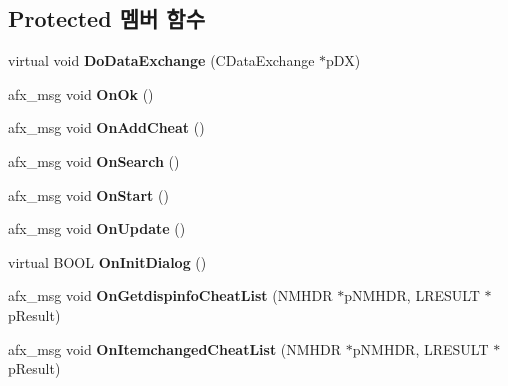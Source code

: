 \subsection*{Protected 멤버 함수}
\begin{DoxyCompactItemize}
\item 
\mbox{\label{class_g_b_cheat_search_ab867411287037dfaee49451bb149d5ad}} 
virtual void {\bfseries Do\+Data\+Exchange} (C\+Data\+Exchange $\ast$p\+DX)
\item 
\mbox{\label{class_g_b_cheat_search_a8a4503d0b05a2061a281f01b6e23f586}} 
afx\+\_\+msg void {\bfseries On\+Ok} ()
\item 
\mbox{\label{class_g_b_cheat_search_acd735709495f4e21e284a4442886152a}} 
afx\+\_\+msg void {\bfseries On\+Add\+Cheat} ()
\item 
\mbox{\label{class_g_b_cheat_search_acdfee4ab94748a31036cd473c60a4573}} 
afx\+\_\+msg void {\bfseries On\+Search} ()
\item 
\mbox{\label{class_g_b_cheat_search_add94032f04d4e03bee943d9a7051df20}} 
afx\+\_\+msg void {\bfseries On\+Start} ()
\item 
\mbox{\label{class_g_b_cheat_search_a9e91910287e7ff53576af9b32de875ad}} 
afx\+\_\+msg void {\bfseries On\+Update} ()
\item 
\mbox{\label{class_g_b_cheat_search_a8aba3602d876fba97b2ef5195dc0b648}} 
virtual B\+O\+OL {\bfseries On\+Init\+Dialog} ()
\item 
\mbox{\label{class_g_b_cheat_search_ae7ab3b9b14715f3984bdef66ed321e1f}} 
afx\+\_\+msg void {\bfseries On\+Getdispinfo\+Cheat\+List} (N\+M\+H\+DR $\ast$p\+N\+M\+H\+DR, L\+R\+E\+S\+U\+LT $\ast$p\+Result)
\item 
\mbox{\label{class_g_b_cheat_search_af1edf086e30536c43b13528e4114ebc2}} 
afx\+\_\+msg void {\bfseries On\+Itemchanged\+Cheat\+List} (N\+M\+H\+DR $\ast$p\+N\+M\+H\+DR, L\+R\+E\+S\+U\+LT $\ast$p\+Result)
\end{DoxyCompactItemize}
